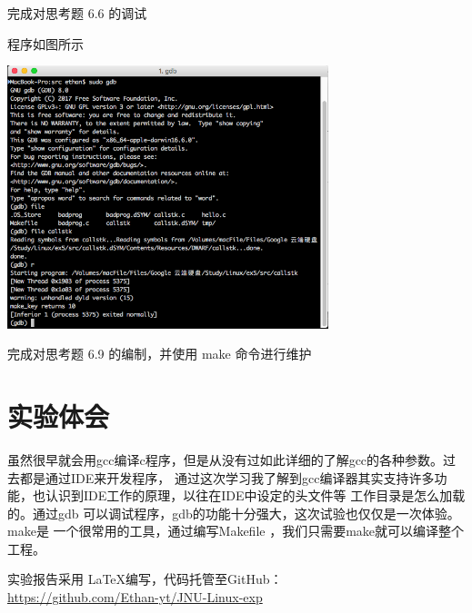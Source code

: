 \documentclass{JNUexp}
\begin{document}
\begin{problem}
    完成对思考题 6.6 的调试
\end{problem}

\begin{answer}
    程序如图所示
    
\end{answer}

\begin{image}
    \includegraphics[width=0.7\textwidth]{5}
\end{image}

\begin{problem}
    完成对思考题 6.9 的编制，并使用 make 命令进行维护
\end{problem}

\begin{answer}
    Makefile如图所示
    make},title=Makefile]{../src/Makefile}
\end{answer}

\newpage
\section{实验体会}
虽然很早就会用gcc编译c程序，但是从没有过如此详细的了解gcc的各种参数。过去都是通过IDE来开发程序，
通过这次学习我了解到gcc编译器其实支持许多功能，也认识到IDE工作的原理，以往在IDE中设定的头文件等
工作目录是怎么加载的。通过gdb 可以调试程序，gdb的功能十分强大，这次试验也仅仅是一次体验。make是
一个很常用的工具，通过编写Makefile ，我们只需要make就可以编译整个工程。

\vfill

实验报告采用 \LaTeX 编写，代码托管至GitHub：\\
\url{https://github.com/Ethan-yt/JNU-Linux-exp}
\end{document}
